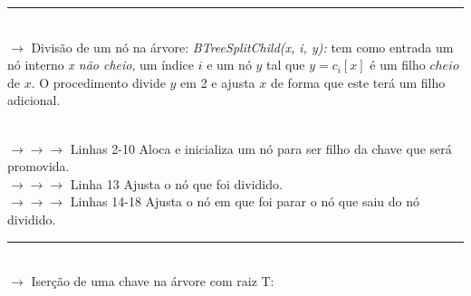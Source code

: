 \documentclass[a4paper, 12pt]{article}
\begin{document}
\rule{12cm}{0.4pt}\\

$\rightarrow$ Divisão de um nó na árvore: \textit{BTreeSplitChild(x, i, y):} tem como entrada um nó interno \textit{x não cheio}, um índice $i$ e um nó $y$ tal que $y = c_{i}[x]$ é um filho $cheio$ de $x$. O procedimento divide $y$ em 2 e ajusta $x$ de forma que este terá um filho adicional.\\

\begin{algorithmic}[1]
\EndFor
{}
	\EndFor
\EndIf
{}
\EndFor
{}
\EndFor
{}
\end{algorithmic}
\textcolor{white}{               }\\
$\rightarrow \rightarrow \rightarrow$ Linhas 2-10 Aloca e inicializa um nó para ser filho da chave que será promovida.\\
$\rightarrow \rightarrow \rightarrow$ Linha 13 Ajusta o nó que foi dividido.\\
$\rightarrow \rightarrow \rightarrow$ Linhas 14-18 Ajusta o nó em que foi parar o nó que saiu do nó dividido.

\rule{12cm}{0.4pt}\\

$\rightarrow$ Iserção de uma chave na árvore com raiz T:\\

\begin{algorithmic}[1]
\Else
\EndIf
\end{algorithmic}
\textcolor{white}{               }\\
\end{document}

